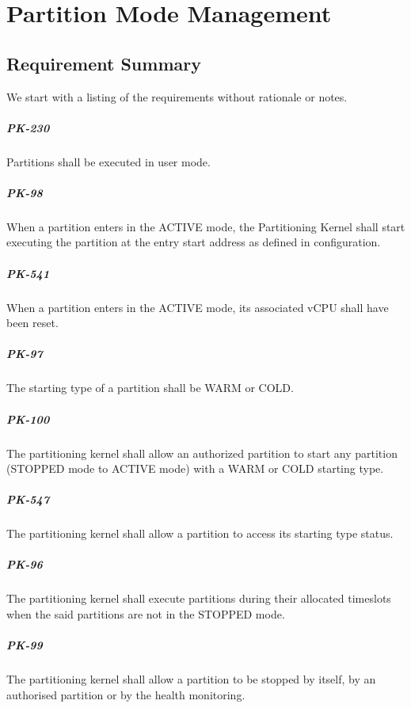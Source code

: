 \chapter{Partition Mode Management}

\newpage
\section{Requirement Summary}
We start with a listing of the requirements without rationale or notes.

\paragraph{PK-230}
Partitions shall be executed in user mode.
\paragraph{PK-98}
When a partition enters in the ACTIVE mode,
the Partitioning Kernel shall start executing the partition
at the entry start address as defined in configuration.
\paragraph{PK-541}
When a partition enters in the ACTIVE mode,
its associated vCPU shall have been reset.
\paragraph{PK-97}
The starting type of a partition shall be WARM or COLD.
\paragraph{PK-100}
The partitioning kernel shall allow an authorized partition
to start any partition (STOPPED mode to ACTIVE mode)
with a WARM or COLD starting type.
\paragraph{PK-547}
The partitioning kernel shall allow
a partition to access its starting type status.
\paragraph{PK-96}
The partitioning kernel shall execute partitions
during their allocated timeslots
when the said partitions are not in the STOPPED mode.
\paragraph{PK-99}
The partitioning kernel shall allow a partition
to be stopped by itself,
by an authorised partition or by the health monitoring.
